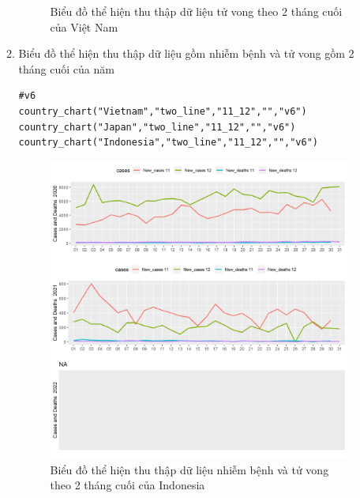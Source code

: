 \documentclass[a4paper]{article}
\theoremstyle{definition}
\begin{document}
\begin{enumerate}[i)]
\begin{enumerate}[1)]
\begin{figure}[htp]
		    \caption{Biểu đồ thể hiện thu thập dữ liệu tử vong theo 2 tháng cuối của Việt Nam}
		    \label{fig:my_label}
		\end{figure}
    \newpage
    \item Biểu đồ thể hiện thu thập dữ liệu gồm nhiễm bệnh và tử vong gồm 2 tháng cuối của năm
    \begin{lstlisting}[frame=single]  
#v6
country_chart("Vietnam","two_line","11_12","","v6")
country_chart("Japan","two_line","11_12","","v6")
country_chart("Indonesia","two_line","11_12","","v6")
		\end{lstlisting}
		\begin{figure}[htp]
		    \centering
		    \includegraphics[scale = 0.7]{Images/V/v6 Indonesia .jpeg}
		    \caption{Biểu đồ thể hiện thu thập dữ liệu nhiễm bệnh và tử vong theo 2 tháng cuối của Indonesia}
		    \label{fig:my_label}
		\end{figure}
		\begin{figure}[htp]
		    \centering

\end{figure}
\end{enumerate}
\end{enumerate}
\end{document}
